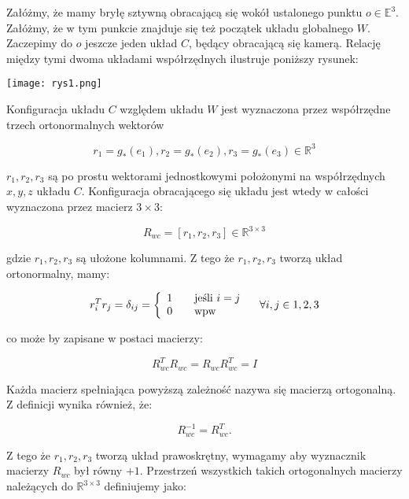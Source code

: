 \documentclass[a4paper,12pt]{article}
\newcommand{\E}{\mathbb{E}}
\newcommand{\RR}{\mathbb{R}^3}
\newcommand{\RRR}{\mathbb{R}^{3 \times 3}}
\begin{document}
Załóżmy, że mamy bryłę sztywną obracającą się wokół ustalonego punktu $o \in \E^3$. Załóżmy, że w tym punkcie znajduje się też początek układu globalnego $W$. Zaczepimy do $o$ jeszcze jeden układ $C$, będący obracającą się kamerą. Relację między tymi dwoma układami współrzędnych ilustruje poniższy rysunek:

\begin{center}
\texttt{[image: rys1.png]}
\end{center}

Konfiguracja układu $C$ względem układu $W$ jest wyznaczona przez współrzędne trzech ortonormalnych wektorów 

\begin{equation}
r_1=g_*(e_1), r_2=g_*(e_2), r_3=g_*(e_3) \in \RR
\end{equation}

$r_1,r_2,r_3$ są po prostu wektorami jednostkowymi położonymi na współrzędnych $x,y,z$ układu $C$. Konfiguracja obracającego się układu jest wtedy w całości wyznaczona przez macierz $3 \times 3$:

\begin{equation}
R_{wc} = [r_1,r_2,r_3] \in \RRR 
\end{equation}

\noindent gdzie $r_1,r_2,r_3$ są ułożone kolumnami. Z tego że $r_1,r_2,r_3$ tworzą układ ortonormalny, mamy:

\begin{equation}
r^T_ir_j = \delta_{ij} = \left\{
  \begin{array}{l l}
    1 & \quad \text{jeśli $i=j$}\\
    0 & \quad \text{wpw}\\
  \end{array} \right.
  \quad \forall i,j \in {1,2,3}
\end{equation}

\noindent co może by zapisane w postaci macierzy:

\begin{equation}
R_{wc}^TR_{wc} = R_{wc}R_{wc}^T = I
\end{equation}

Każda macierz spełniająca powyższą zależność nazywa się macierzą ortogonalną. Z definicji wynika również, że:

\begin{equation}
R_{wc}^{-1} = R_{wc}^T. 
\end{equation}

Z tego że $r_1,r_2,r_3$ tworzą układ prawoskrętny, wymagamy aby wyznacznik macierzy $R_{wc}$ był równy $+1$. Przestrzeń wszystkich takich ortogonalnych macierzy należących do $\RRR$ definiujemy jako:
\end{document}
